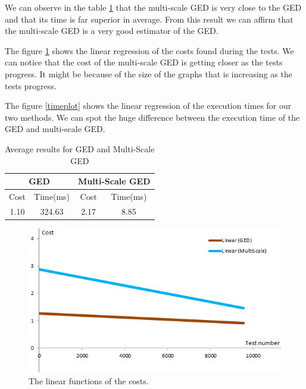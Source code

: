 \documentclass[UTF8, twoside]{EPURapport}
\begin{document}
	We can observe in the table \ref{tab:averageResults} that the multi-scale GED is very close to the GED and that its time is far superior in average. From this result we can affirm that the multi-scale GED is a very good estimator of the GED.
	
	The figure \ref{costplot} shows the linear regression of the costs found during the tests. We can notice that the cost of the multi-scale GED is getting closer as the tests progress. It might be because of the size of the graphs that is increasing as the tests progress.
	
	The figure \ref{timeplot} shows the linear regression of the execution times for our two methods. We can spot the huge difference between the execution time of the GED and multi-scale GED.
	
\begin{table}[!h]
\centering
\setlength{\extrarowheight}{1.5pt}
\begin{tabular}{|c|c|c|c|} 
\hline
\multicolumn{2}{|c|}{GED} &  \multicolumn{2}{c|}{Multi-Scale GED}\\
\hline
Cost & Time(ms) & Cost & Time(ms)\\
\hline
1.10 & 324.63 & 2.17 & 8.85\\
\hline
\end{tabular}
\caption{\label{tab:averageResults}Average results for GED and Multi-Scale GED}
\end{table}

\begin{figure} [h]
	\centering \includegraphics{images/GEDvsMultiScalePlot.png}
	\caption {The linear functions of the costs.}	
	\label {costplot}
\end{figure}
\end{document}
